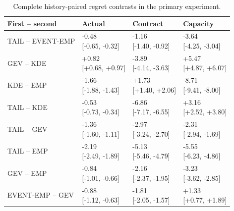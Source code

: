 \begingroup
\fontsize{8.5}{10.5}\selectfont\setlength{\tabcolsep}{3.0pt}\renewcommand{\arraystretch}{1.23}
\begin{table}[tbp]\centering
\caption{Complete history-paired regret contrasts in the primary experiment.}\label{tab:final-si-12}
\begin{tabular}{@{}llll@{}}\toprule
First -- second & Actual & Contract & Capacity\\\midrule
TAIL -- EVENT-EMP & \shortstack{-0.48\\{}[-0.65, -0.32]} & \shortstack{-1.16\\{}[-1.40, -0.92]} & \shortstack{-3.64\\{}[-4.25, -3.04]}\\
GEV -- KDE & \shortstack{+0.82\\{}[+0.68, +0.97]} & \shortstack{-3.89\\{}[-4.14, -3.63]} & \shortstack{+5.47\\{}[+4.87, +6.07]}\\
KDE -- EMP & \shortstack{-1.66\\{}[-1.88, -1.43]} & \shortstack{+1.73\\{}[+1.40, +2.06]} & \shortstack{-8.71\\{}[-9.41, -8.00]}\\
TAIL -- KDE & \shortstack{-0.53\\{}[-0.73, -0.34]} & \shortstack{-6.86\\{}[-7.17, -6.55]} & \shortstack{+3.16\\{}[+2.52, +3.80]}\\
TAIL -- GEV & \shortstack{-1.36\\{}[-1.60, -1.11]} & \shortstack{-2.97\\{}[-3.24, -2.70]} & \shortstack{-2.31\\{}[-2.94, -1.69]}\\
TAIL -- EMP & \shortstack{-2.19\\{}[-2.49, -1.89]} & \shortstack{-5.13\\{}[-5.46, -4.79]} & \shortstack{-5.55\\{}[-6.23, -4.86]}\\
GEV -- EMP & \shortstack{-0.84\\{}[-1.01, -0.66]} & \shortstack{-2.16\\{}[-2.37, -1.95]} & \shortstack{-3.23\\{}[-3.62, -2.85]}\\
EVENT-EMP -- GEV & \shortstack{-0.88\\{}[-1.12, -0.63]} & \shortstack{-1.81\\{}[-2.05, -1.57]} & \shortstack{+1.33\\{}[+0.77, +1.89]}\\

\end{tabular}
\end{table}
